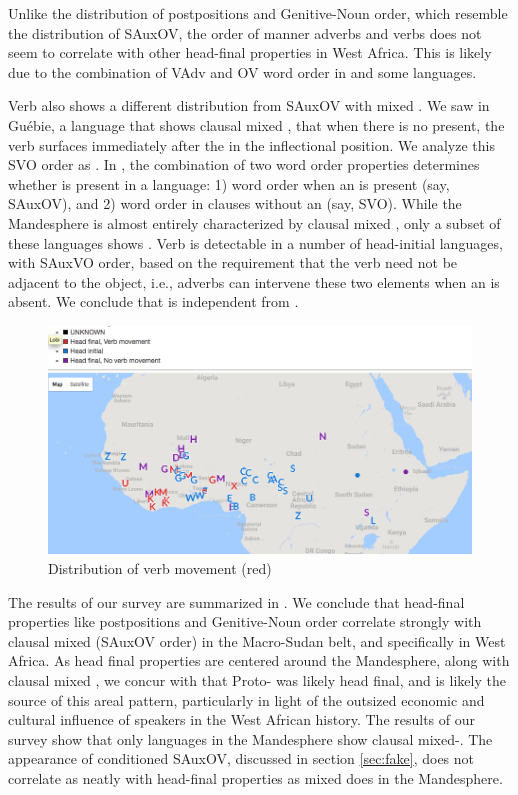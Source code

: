 \documentclass[output=paper,newtxmath,modfonts,nonflat,draftmode]{langsci/langscibook}
\begin{document}
Unlike the distribution of postpositions and Genitive-Noun order, which resemble the distribution of SAuxOV, the order of manner adverbs and verbs does not seem to correlate with other head-final properties in West Africa. This is likely due to the combination of VAdv and OV word order in  and some  languages.

Verb  also shows a different distribution from SAuxOV with mixed . We saw in Guébie, a language that shows clausal mixed , that when there is no  present, the verb surfaces immediately after the  in the inflectional position. We analyze this SVO order as . In , the combination of two word order properties determines whether  is present in a language: 1) word order when an  is present (say, SAuxOV), and 2) word order in clauses without an  (say, SVO). While the Mandesphere is almost entirely characterized by clausal mixed , only a subset of these languages shows . Verb  is detectable in a number of head-initial languages, with SAuxVO order, based on the requirement that the verb need not be adjacent to the object, i.e., adverbs can intervene these two elements when an  is absent. We conclude that  is independent from .

\begin{figure}
   \centering
    \includegraphics[width = .7\textwidth]{figures/VMove}
    \caption{Distribution of verb movement (red)}\label{fig:sande:vmove}
\end{figure}

The results of our survey are summarized in . We conclude that head-final properties like postpositions and Genitive-Noun order correlate strongly with clausal mixed  (SAuxOV  order) in the Macro-Sudan belt, and specifically in West Africa. As head final properties are centered around the Mandesphere, along with clausal mixed , we concur with \citet{heine76} that Proto- was likely head final, and is likely the source of this areal pattern, particularly in light of the outsized economic and cultural influence of  speakers in the West African history. The results of our survey show that only languages in the Mandesphere show clausal mixed-. The appearance of conditioned SAuxOV, discussed in section \ref{sec:fake}, does not correlate as neatly with head-final properties as mixed  does in the Mandesphere.
\end{document}
